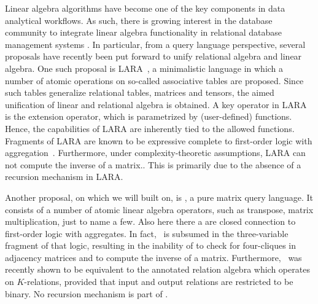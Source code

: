 
%
Linear algebra algorithms have become one of the key components in data analytical workflows. As such, there is growing interest in the database community to integrate linear algebra functionality in relational database management systems \cite{}. In particular, from a query language perspective, several proposals have recently been put forward to unify relational algebra and linear algebra. One such proposal is LARA~\cite{}, a minimalistic language in which a number of atomic operations on so-called associative tables are proposed. Since such tables generalize relational tables, matrices and tensors, the aimed unification of linear and relational algebra is obtained. A key operator in LARA is the extension operator, which is parametrized by (user-defined) functions. Hence, the capabilities of LARA are inherently tied to the allowed functions. Fragments of LARA are known to be expressive complete to first-order logic with aggregation~\cite{}. Furthermore, under complexity-theoretic assumptions, LARA can not compute the inverse of a matrix.\cite{}. This is primarily due to the absence of a recursion mechanism in LARA. 


Another proposal, on which we will built on, is \lang, a pure matrix query language. It consists of a number of atomic linear algebra operators, such as transpose, matrix multiplication, just to name a few. Also here there a are closed connection to first-order logic with aggregates. In fact, \lang\ is subsumed in the three-variable fragment of that logic, resulting in the inability of \lang to check for four-cliques in adjacency matrices and to compute the inverse of a matrix. Furthermore, \lang\ was recently shown to be equivalent to the annotated relation algebra which operates on $K$-relations, provided that input and output relations are restricted to be binary. No recursion mechanism is part of \lang.


